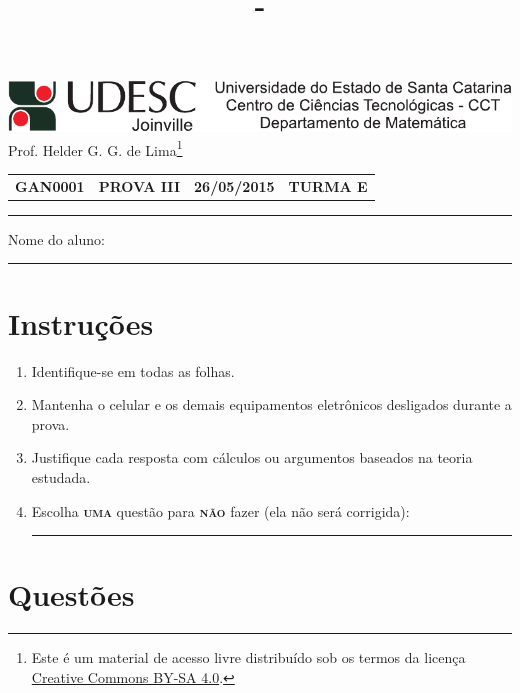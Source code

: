 \documentclass[12pt,a4paper]{article}
\author{\eu}
\title{\tipo - \disciplina}
\date{\data}
\newcommand*\tipo{PROVA III}
\newcommand*\turma{TURMA E}
\newcommand*\disciplina{GAN0001}
\newcommand*\eu{Helder G. G. de Lima}
\newcommand*\data{26/05/2015}
\begin{document}
\thispagestyle{empty}
\begin{center}
\includegraphics{udesc_joinville_cabecalho.pdf}
\\ Prof. \eu\footnote{
Este é um material de acesso livre distribuído sob os termos da licença \href{https://creativecommons.org/licenses/by-sa/4.0/deed.pt_BR}{Creative Commons BY-SA 4.0}.}

\noindent\begin{tabular}{l c c r}
  \textbf{\disciplina}
& \textbf{\tipo}
& \textbf{\data}
& \textbf{\turma}
\end{tabular}\vspace{-0.3cm}
\noindent\rule{17cm}{0.01cm}
\end{center}

\noindent Nome do aluno: \rule{14cm}{0.01cm}

\section*{Instruções}

\begin{enumerate}
\renewcommand{\theenumi}{\Roman{enumi}}
\item Identifique-se em todas as folhas.
\item Mantenha o celular e os demais equipamentos eletrônicos desligados durante a prova.
\item Justifique cada resposta com cálculos ou argumentos baseados na teoria estudada.
\item Escolha \textsc{\textbf{uma}} questão para \textsc{\textbf{não}} fazer (ela não será corrigida): \rule{3cm}{0.01cm}
\end{enumerate}

\section*{Questões}
\end{document}
